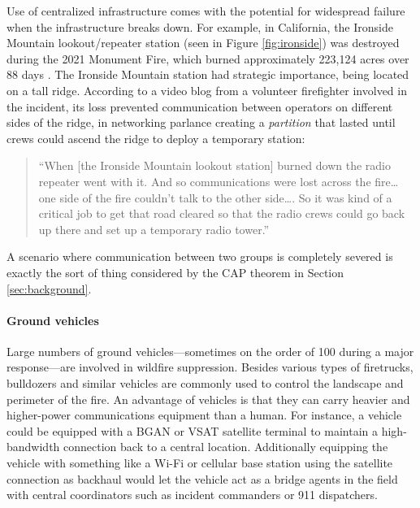 \documentclass[]             %
{NASA}                       %
\theoremstyle{definition}
\begin{document}
Use of centralized infrastructure comes with the potential for
widespread failure when the infrastructure breaks down. For example,
in California, the Ironside Mountain lookout/repeater station (seen in
Figure \ref{fig:ironside}) was destroyed during the 2021 Monument
Fire, which burned approximately 223,124 acres over 88 days
\cite{2021:monumentfire}. The Ironside Mountain station had strategic
importance, being located on a tall ridge. According to a video blog
from a volunteer firefighter involved in the incident, its loss
prevented communication between operators on different sides of the
ridge, in networking parlance creating a \emph{partition} that lasted
until crews could ascend the ridge to deploy a temporary station:
\begin{quote}
  ``When {[}the Ironside Mountain lookout station{]} burned down the
  radio repeater went with it. And so communications were lost across
  the fire\ldots{} one side of the fire couldn't talk to the other
  side\ldots.  So it was kind of a critical job to get that road
  cleared so that the radio crews could go back up there and set up a
  temporary radio tower.'' \cite{2022:mechfire}%
\end{quote}
A scenario where communication between two groups is completely
severed is exactly the sort of thing considered by the CAP theorem in
Section \ref{sec:background}.

\paragraph{Ground vehicles}
Large numbers of ground vehicles---sometimes on the order of 100
during a major response---are involved in wildfire
suppression. Besides various types of firetrucks, bulldozers and
similar vehicles are commonly used to control the landscape and
perimeter of the fire. An advantage of vehicles is that they can carry
heavier and higher-power communications equipment than a human. For
instance, a vehicle could be equipped with a BGAN or VSAT satellite
terminal to maintain a high-bandwidth connection back to a central
location. Additionally equipping the vehicle with something like a
Wi-Fi or cellular base station using the satellite connection as
backhaul would let the vehicle act as a bridge agents in the field
with central coordinators such as incident commanders or 911
dispatchers.
\end{document}
